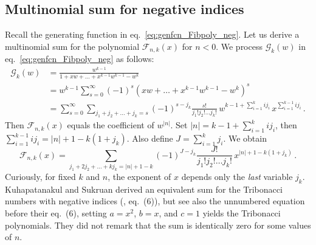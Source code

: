 \documentclass[review]{elsarticle}
\theoremstyle{plain}
\begin{document}
\subsection{Multinomial sum for negative indices}\label{sec:sum_neg}
Recall the generating function in eq.~\eqref{eq:genfcn_Fibpoly_neg}.
Let us derive a multinomial sum for the polynomial $\mathcal{F}_{n,k}(x)$ for $n<0$.
We process $\mathcal{G}_k(w)$ in eq.~\eqref{eq:genfcn_Fibpoly_neg} as follows:
\begin{equation}  
\begin{split}  
  \mathcal{G}_k(w) &= \frac{w^{k-1}}{1 +xw +\dots +x^{k-1}w^{k-1} -w^k}
  \\
  &= w^{k-1}\sum_{s=0}^\infty (-1)^s(xw +\dots +x^{k-1}w^{k-1} -w^k)^s
  \\
  &= \sum_{s=0}^\infty \sum_{j_1+j_2+\dots+j_k=s} (-1)^{s-j_k}\frac{s!}{j_1!j_2!\dots j_k!}
  \,w^{k-1+\sum_{i=1}^k ij_i} \,x^{\sum_{i=1}^{k-1} ij_i} \,.
\end{split}  
\end{equation}
Then $\mathcal{F}_{n,k}(x)$ equals the coefficient of $w^{|n|}$.
Set $|n| = k-1+\sum_{i=1}^k ij_i$, then $\sum_{i=1}^{k-1} ij_i = |n|+1-k(1+j_k)$.
Also define $J = \sum_{i=1}^k j_i$. We obtain
\begin{equation}  
\label{eq:multsum_neg}    
  \mathcal{F}_{n,k}(x) = \sum_{j_1+2j_2+\dots +kj_k=|n|+1-k} (-1)^{J-j_k}\frac{J!}{j_1!j_2!\dots j_k!} \,x^{|n|+1-k(1+j_k)} \,.
\end{equation}
Curiously, for fixed $k$ and $n$, the exponent of $x$ depends only the \emph{last} variable $j_k$.
Kuhapatanakul and Sukruan derived an equivalent sum for the Tribonacci numbers with negative indices (\cite{Kuhapatanakul_Sukruan}, eq.~(6)),
but see also the unnumbered equation before their eq.~(6), setting $a=x^2$, $b=x$, and $c=1$ yields the Tribonacci polynomials.
They did not remark that the sum is identically zero for some values of $n$.

\end{document}
